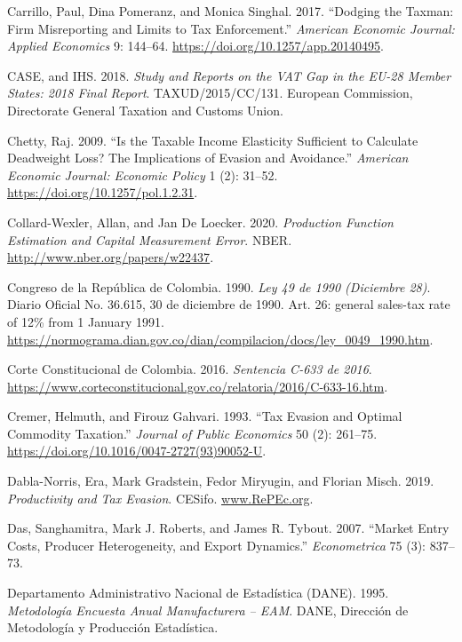 \documentclass[
  12pt,
  letterpaper,
  oneside,
  openany]{report}
\newlength{\cslhangindent}
\newenvironment{CSLReferences}[2] %
 {\begin{list}{}{%
  \setlength{\itemindent}{0pt}
  \setlength{\leftmargin}{0pt}
  \setlength{\parsep}{0pt}
  \ifodd #1
   \setlength{\leftmargin}{\cslhangindent}
   \setlength{\itemindent}{-1\cslhangindent}
  \fi
  \setlength{\itemsep}{#2\baselineskip}}}
 {\end{list}}
\begin{document}
\begin{CSLReferences}{1}{1}
Carrillo, Paul, Dina Pomeranz, and Monica Singhal. 2017. {``Dodging the
Taxman: Firm Misreporting and Limits to Tax Enforcement.''}
\emph{American Economic Journal: Applied Economics} 9: 144--64.
\url{https://doi.org/10.1257/app.20140495}.

CASE, and IHS. 2018. \emph{Study and Reports on the {VAT} Gap in the
{EU}-28 Member States: 2018 Final Report}. TAXUD/2015/CC/131. {European
Commission, Directorate General Taxation and Customs Union}.

Chetty, Raj. 2009. {``Is the Taxable Income Elasticity Sufficient to
Calculate Deadweight Loss? The Implications of Evasion and Avoidance.''}
\emph{American Economic Journal: Economic Policy} 1 (2): 31--52.
\url{https://doi.org/10.1257/pol.1.2.31}.

Collard-Wexler, Allan, and Jan De Loecker. 2020. \emph{Production
Function Estimation and Capital Measurement Error}. NBER.
\url{http://www.nber.org/papers/w22437}.

Congreso de la República de Colombia. 1990. \emph{Ley 49 de 1990
(Diciembre 28)}. Diario Oficial No. 36.615, 30 de diciembre de 1990.
Art. 26: general sales-tax rate of 12\% from 1 January 1991.
\url{https://normograma.dian.gov.co/dian/compilacion/docs/ley_0049_1990.htm}.

Corte Constitucional de Colombia. 2016. \emph{Sentencia {C-633} de
2016}.
\url{https://www.corteconstitucional.gov.co/relatoria/2016/C-633-16.htm}.

Cremer, Helmuth, and Firouz Gahvari. 1993. {``Tax Evasion and Optimal
Commodity Taxation.''} \emph{Journal of Public Economics} 50 (2):
261--75. \url{https://doi.org/10.1016/0047-2727(93)90052-U}.

Dabla-Norris, Era, Mark Gradstein, Fedor Miryugin, and Florian Misch.
2019. \emph{Productivity and Tax Evasion}. CESifo.
\href{https://www.RePEc.org}{www.RePEc.org}.

Das, Sanghamitra, Mark J. Roberts, and James R. Tybout. 2007. {``Market
Entry Costs, Producer Heterogeneity, and Export Dynamics.''}
\emph{Econometrica} 75 (3): 837--73.

Departamento Administrativo Nacional de Estadística (DANE). 1995.
\emph{Metodolog{í}a Encuesta Anual Manufacturera -- {EAM}}. DANE,
Direcci{ó}n de Metodolog{í}a y Producci{ó}n Estad{í}stica.


\end{CSLReferences}
\end{document}
